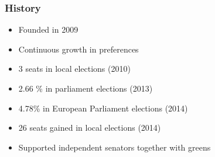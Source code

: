 \begin{frame}
	\frametitle{History}
	\begin{itemize}
		\item Founded in 2009
		\item Continuous growth in preferences 
		\item 3 seats in local elections (2010)
		\item 2.66 \% in parliament elections (2013)
		\item 4.78\% in European Parliament elections (2014)
		\item 26 seats gained in local elections (2014)
		\item Supported independent senators together with greens
	\end{itemize}
	
\end{frame}

